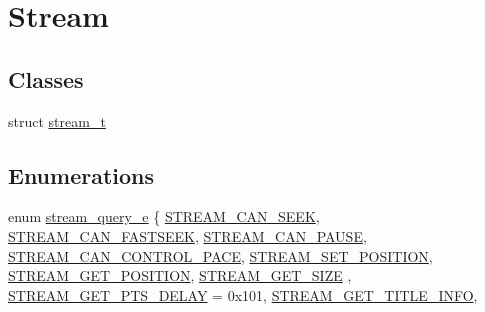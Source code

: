 \hypertarget{group__stream}{}\section{Stream}
\label{group__stream}
\subsection*{Classes}
\begin{DoxyCompactItemize}
\item 
struct \hyperlink{structstream__t}{stream\+\_\+t}
\end{DoxyCompactItemize}
\subsection*{Enumerations}
\begin{DoxyCompactItemize}
\item 
enum \hyperlink{group__stream_gac90a8aaf65579464a5604c9de255929a}{stream\+\_\+query\+\_\+e} \{ \newline
\hyperlink{group__stream_ggac90a8aaf65579464a5604c9de255929aaa8713b90e0df50b9ce6653211d20f4f9}{S\+T\+R\+E\+A\+M\+\_\+\+C\+A\+N\+\_\+\+S\+E\+EK}, 
\hyperlink{group__stream_ggac90a8aaf65579464a5604c9de255929aa8aec9890f93fde818e3fe8bacd7496ec}{S\+T\+R\+E\+A\+M\+\_\+\+C\+A\+N\+\_\+\+F\+A\+S\+T\+S\+E\+EK}, 
\hyperlink{group__stream_ggac90a8aaf65579464a5604c9de255929aa8dd0cea80134003f8582ff8e8c5d48d3}{S\+T\+R\+E\+A\+M\+\_\+\+C\+A\+N\+\_\+\+P\+A\+U\+SE}, 
\hyperlink{group__stream_ggac90a8aaf65579464a5604c9de255929aa4ad696863f1d78fdce009c9d3ca249a0}{S\+T\+R\+E\+A\+M\+\_\+\+C\+A\+N\+\_\+\+C\+O\+N\+T\+R\+O\+L\+\_\+\+P\+A\+CE}, 
\newline
\hyperlink{group__stream_ggac90a8aaf65579464a5604c9de255929aaa2200d3aaa6b35f4eb4bfc9b0c9a4dd9}{S\+T\+R\+E\+A\+M\+\_\+\+S\+E\+T\+\_\+\+P\+O\+S\+I\+T\+I\+ON}, 
\hyperlink{group__stream_ggac90a8aaf65579464a5604c9de255929aa90d98a3ef92e3829177249d2987b334d}{S\+T\+R\+E\+A\+M\+\_\+\+G\+E\+T\+\_\+\+P\+O\+S\+I\+T\+I\+ON}, 
\hyperlink{group__stream_ggac90a8aaf65579464a5604c9de255929aad711fafff9c55278e65102af584a235b}{S\+T\+R\+E\+A\+M\+\_\+\+G\+E\+T\+\_\+\+S\+I\+ZE}
, \hyperlink{group__stream_ggac90a8aaf65579464a5604c9de255929aa63fe5c80dc98e616cc68efb5a677bdd2}{S\+T\+R\+E\+A\+M\+\_\+\+G\+E\+T\+\_\+\+P\+T\+S\+\_\+\+D\+E\+L\+AY} = 0x101, 
\newline
\hyperlink{group__stream_ggac90a8aaf65579464a5604c9de255929aaff4a61fe8c4a4bb2d9ed917189481f00}{S\+T\+R\+E\+A\+M\+\_\+\+G\+E\+T\+\_\+\+T\+I\+T\+L\+E\+\_\+\+I\+N\+FO}, 

\end{DoxyCompactItemize}
